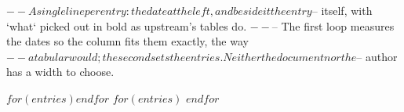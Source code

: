 $-- A single line per entry: the date at the left, and beside it the entry
$-- itself, with `what` picked out in bold as upstream's tables do.
$--
$-- The first loop measures the dates so the column fits them exactly, the way
$-- a tabular would; the second sets the entries. Neither the document nor the
$-- author has a width to choose.
\begin{cvlisting}
$for(entries)$$endfor$
$for(entries)$
$endfor$
\end{cvlisting}
